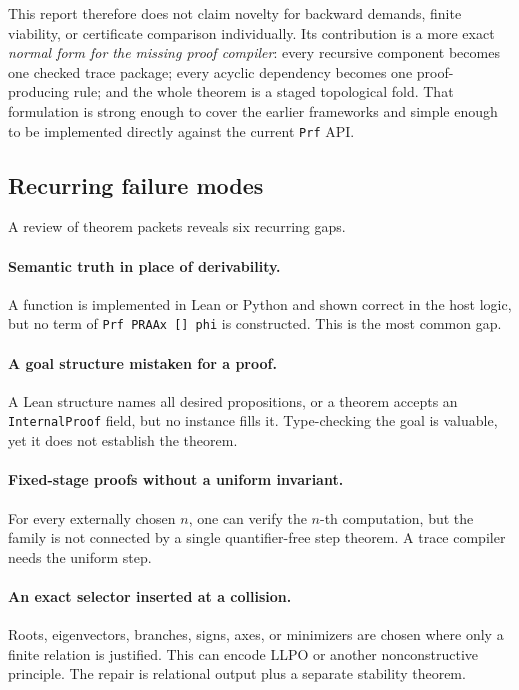 This report therefore does not claim novelty for backward demands, finite
viability, or certificate comparison individually.  Its contribution is a
more exact \emph{normal form for the missing proof compiler}: every recursive
component becomes one checked trace package; every acyclic dependency becomes
one proof-producing rule; and the whole theorem is a staged topological fold.
That formulation is strong enough to cover the earlier frameworks and simple
enough to be implemented directly against the current \texttt{Prf} API.

\subsection{Recurring failure modes}

A review of theorem packets reveals six recurring gaps.

\paragraph{Semantic truth in place of derivability.}
A function is implemented in Lean or Python and shown correct in the host
logic, but no term of \texttt{Prf PRAAx [] phi} is constructed.  This is the
most common gap.

\paragraph{A goal structure mistaken for a proof.}
A Lean structure names all desired propositions, or a theorem accepts an
\texttt{InternalProof} field, but no instance fills it.  Type-checking the goal
is valuable, yet it does not establish the theorem.

\paragraph{Fixed-stage proofs without a uniform invariant.}
For every externally chosen \(n\), one can verify the \(n\)-th computation,
but the family is not connected by a single quantifier-free step theorem.  A
trace compiler needs the uniform step.

\paragraph{An exact selector inserted at a collision.}
Roots, eigenvectors, branches, signs, axes, or minimizers are chosen where only
a finite relation is justified.  This can encode LLPO or another nonconstructive
principle.  The repair is relational output plus a separate stability theorem.

